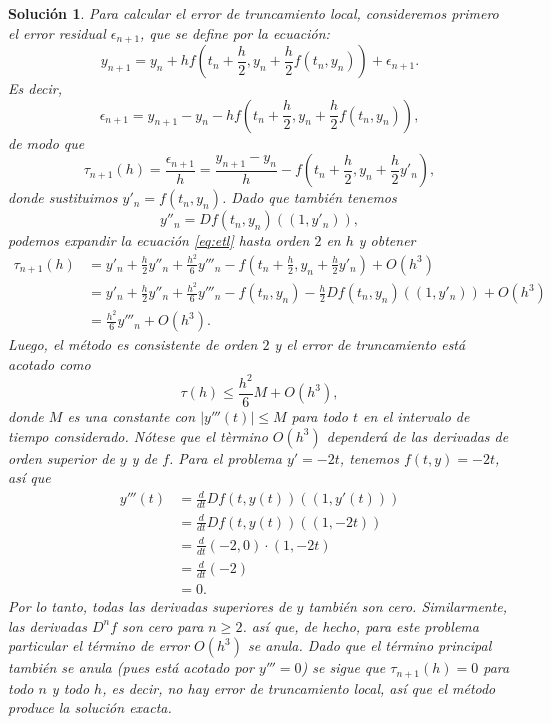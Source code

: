 \documentclass[11pt,letterpaper]{article}
\newtheorem*{sol}{Solución}
\begin{document}
\begin{sol}
  Para calcular el error de truncamiento local, consideremos primero
  el error residual $\epsilon_{n+1}$, que se define por la ecuación:
  \begin{equation}
    y_{n+1} = y_n + h f\left(t_n + \frac{h}{2}, y_n +
    \frac{h}{2}f(t_n,y_n)\right) + \epsilon_{n+1}
  .\end{equation}
  Es decir,
  \begin{equation}
    \epsilon_{n+1}
    =
    y_{n+1} - y_n - h f\left(t_n + \frac{h}{2}, y_n + \frac{h}{2}f(t_n,y_n)\right)
  ,\end{equation}
  de modo que
  \begin{equation}\label{eq:etl}
    \tau_{n+1}(h)
    = \frac{\epsilon_{n+1}}{h}
    = \frac{y_{n+1} - y_n}{h}
    - f\left(t_n + \frac{h}{2}, y_n + \frac{h}{2}y'_n\right)
  ,\end{equation}
  donde sustituimos $y'_n = f(t_n,y_n)$. Dado que también tenemos
  \begin{equation}
    y''_n = Df(t_n,y_n)((1,y'_n))
  ,\end{equation}
  podemos expandir la ecuación \eqref{eq:etl} hasta orden $2$ 
  en $h$ y obtener
  \begin{align}
    \tau_{n+1}(h) 
    &=
    y'_n + \frac{h}{2}y''_n + \frac{h^{2}}{6}y'''_n
    - f\left(t_n + \frac{h}{2}, y_n + \frac{h}{2}y'_n\right) +
    O(h^{3})
    \\
    &=
    y'_n + \frac{h}{2}y''_n + \frac{h^{2}}{6}y'''_n
    - f(t_n, y_n) - \frac{h}{2}Df(t_n,y_n)((1,y'_n))+
    O(h^{3})
    \\
    &=
    \frac{h^{2}}{6}y'''_n + O(h^{3})
  .\end{align}
  Luego, el método es consistente de orden $2$ y el error de
  truncamiento está acotado como
  \begin{equation}
    \tau(h)
    \leq \frac{h^{2}}{6}M + O(h^{3})
  ,\end{equation}
  donde $M$ es una constante con $|y'''(t)|\leq M$ para todo $t$ en el
  intervalo de tiempo considerado.
  Nótese que el tèrmino $O(h^{3})$ dependerá de las derivadas de orden
  superior de $y$ y de $f$.
  Para el problema $y'=-2t$, tenemos $f(t,y)=-2t$, así que
  \begin{align}
    y'''(t)
    &= \frac{d}{dt}Df(t,y(t))((1,y'(t))) \\
    &= \frac{d}{dt}Df(t,y(t))((1,-2t)) \\
    &= \frac{d}{dt}(-2,0)\cdot (1,-2t) \\
    &= \frac{d}{dt}(-2) \\
    &= 0
  .\end{align}
  Por lo tanto, todas las derivadas superiores de $y$ también son
  cero. Similarmente, las derivadas $D^{n}f$ son cero para $n\geq 2$.
  así que, de hecho, para este problema particular el término de error
  $O(h^{3})$ se anula. Dado que el término principal también se anula
  (pues está acotado por $y'''=0$) se sigue que
  $\tau_{n+1}(h)=0$ para todo $n$ y todo $h$, es decir, no hay error
  de truncamiento local, así que el método produce la solución
  exacta.
\end{sol}
\end{document}
